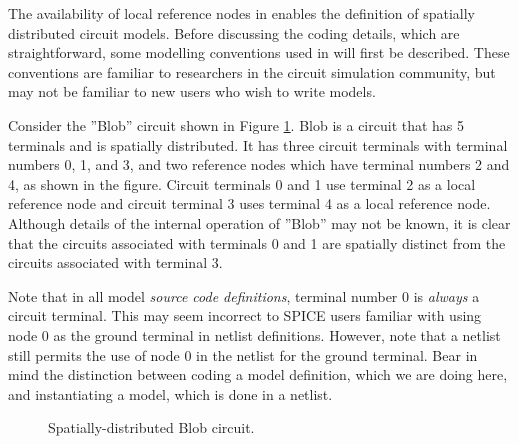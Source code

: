 The availability of local reference nodes in \FDA enables the
definition of spatially distributed circuit models.  Before
discussing the coding details, which are straightforward, some
modelling conventions used in \FDA will first be described.  These
conventions are familiar to researchers in the circuit simulation
community, but may not be familiar to new \FDA users who wish to
write \FDA models.

Consider the ''Blob'' circuit shown in Figure
\ref{nonlinear:blobfig}.  Blob is a circuit that has 5 terminals
and is spatially distributed.  It has three circuit terminals
with terminal numbers 0, 1, and 3, and two reference nodes which
have terminal numbers 2 and 4, as shown in the figure.  Circuit
terminals 0 and 1 use terminal 2 as a local reference node and
circuit terminal 3 uses terminal 4 as a local reference node.
Although details of the internal operation of ''Blob'' may not
be known, it is clear that the circuits associated with
terminals 0 and 1 are spatially distinct from the circuits
associated with terminal 3.

Note that in all \FDA model \emph{source code definitions},
terminal number 0 is \emph{always} a circuit terminal.  This
may seem incorrect to SPICE users familiar with using node 0 as
the ground terminal in netlist definitions.  However, note that
a \FDA netlist still permits the use of node 0 in the netlist
for the ground terminal. Bear in mind the distinction
between coding a model definition, which we are doing here,
and instantiating a model, which is done in a netlist.

\begin{figure}[h]
\centerline{\epsfxsize=13cm }
\caption{Spatially-distributed Blob circuit.
\label{nonlinear:blobfig}}
\end{figure}

